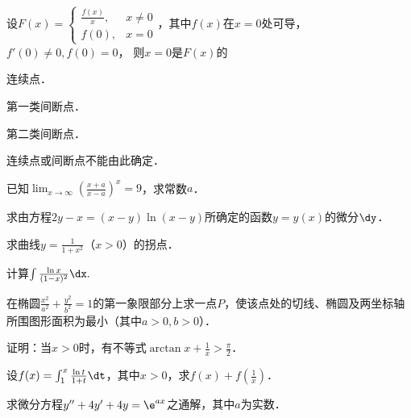 \documentclass[plain,noanswer,medmath]{../../template/jnuexam}
\begin{document}




\begin{problem}
设$F(x)=\begin{cases}
  \frac{f(x)}{x}, & x \ne 0 \\
            f(0), & x = 0
\end{cases}$，其中$f(x)$在$x=0$处可导，$f'(0)\ne 0,f(0)=0$，
则$x=0$是$F(x)$的\pickout{}
\begin{abcd}
\item 连续点．
\item 第一类间断点．
\item 第二类间断点．
\item 连续点或间断点不能由此确定．
\end{abcd}
\end{problem}




\begin{problem}
已知$\lim_{x\to\infty}\left(\frac{x+a}{x-a}\right)^x=9$，求常数$a$．
\end{problem}


\begin{problem}
求由方程$2y-x=(x-y)\ln(x-y)$所确定的函数$y=y(x)$的微分$\dy$．
\end{problem}


\begin{problem}
求曲线$y=\frac{1}{1+x^2}$（$x>0$）的拐点．
\end{problem}


\begin{problem}
计算$\int \frac{\ln x}{(1-x)^2} \dx.$
\end{problem}





\begin{problem}
在椭圆$\frac{x^2}{a^2}+\frac{y^2}{b^2}=1$的第一象限部分上求一点$P$，使该点处的切线、椭圆及两坐标轴所围图形面积为最小（其中$a>0,b>0$）．
\end{problem}



\begin{problem}
证明：当$x>0$时，有不等式$\arctan x+\frac{1}{x}>\frac{\pi}{2}$．
\end{problem}



\begin{problem}
设$f(x)=\int_1^x \frac{\ln t}{1+t} \dt$，其中$x>0$，求$f(x)+f\left(\frac{1}{x} \right)$．
\end{problem}






\begin{problem}
求微分方程$y''+4y'+4y= \e^{ax}$之通解，其中$a$为实数．
\end{problem}
\end{document}
